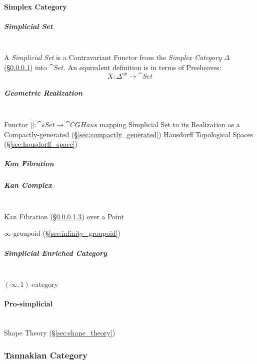 \paragraph{Simplex Category}\label{sec:simplex_category}

\subparagraph{Simplicial Set}\label{sec:simplicial_set}
\hfill \\

A \emph{Simplicial Set} is a Contravariant Functor from the
\emph{Simplex Category} $\Delta$ (\S\ref{sec:simplex_category}) into
$\cat{Set}$. An equivalent definition is in terms of Presheaves:
\[
  X: \Delta^{op} \rightarrow \cat{Set}
\]

\subparagraph{Geometric Realization}\label{sec:geometric_realization}
\hfill \\

Functor $|\dot| : \cat{sSet} \rightarrow \cat{CGHaus}$ mapping
Simplicial Set to its Realization as a Compactly-generated
(\S\ref{sec:compactly_generated}) Hausdorff Topological Spaces
(\S\ref{sec:hausdorff_space})



\subparagraph{Kan Fibration}\label{sec:kan_fibration}

\subparagraph{Kan Complex}\label{sec:kan_complex}
\hfill \\

Kan Fibration (\S\ref{sec:kan_fibration}) over a Point

$\infty$-groupoid (\S\ref{sec:infinity_groupoid})



\subparagraph{Simplicial Enriched Category}
\label{sec:simplicial_enriched}
\hfill \\

$(\infty,1)$-category %



\paragraph{Pro-simplicial}\label{sec:pro_simplicial}
\hfill \\

Shape Theory (\S\ref{sec:shape_theory})



\subsubsection{Tannakian Category}\label{sec:tannakian_category}



